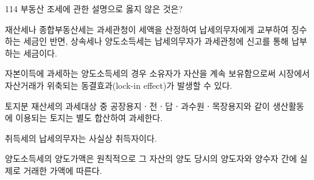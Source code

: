 \begin{question}{114}
부동산 조세에 관한 설명으로 옳지 않은 것은?
\begin{choices}
  \item 재산세나 종합부동산세는 과세관청이 세액을 산정하여 납세의무자에게 교부하여 징수하는 세금인 반면, 상속세나 양도소득세는 납세의무자가 과세관청에 신고를 통해 납부하는 세금이다.
  \item 자본이득에 과세하는 양도소득세의 경우 소유자가 자산을 계속 보유함으로써 시장에서 자산거래가 위축되는 동결효과(lock-in effect)가 발생할 수 있다.
  \item 토지분 재산세의 과세대상 중 공장용지ㆍ전ㆍ답ㆍ과수원ㆍ목장용지와 같이 생산활동에 이용되는 토지는 별도 합산하여 과세한다.
  \item 취득세의 납세의무자는 사실상 취득자이다.
  \item 양도소득세의 양도가액은 원칙적으로 그 자산의 양도 당시의 양도자와 양수자 간에 실제로 거래한 가액에 따른다.
\end{choices}
\end{question}
